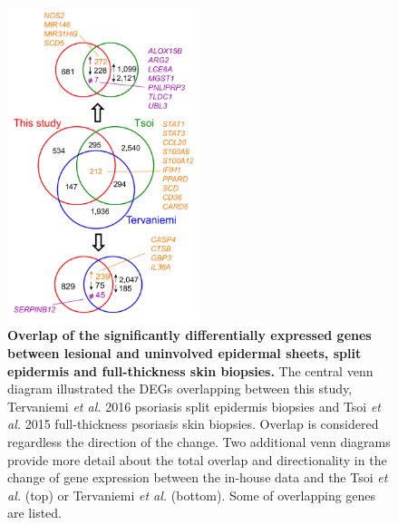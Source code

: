
\begin{figure}[ht]
\centering
\includegraphics[width=0.5\textwidth]{./Results2/pdfs/skin_transcriptomics_venn_diagrams_with_genes}
\caption[Overlap of the significantly differentially expressed genes between lesional and uninvolved epidermal sheets, split epidermis and full-thickness skin biopsies.]{\textbf{Overlap of the significantly differentially expressed genes between lesional and uninvolved epidermal sheets, split epidermis and full-thickness skin biopsies.} The central venn diagram illustrated the DEGs overlapping between this study, Tervaniemi \textit{et al.} 2016 psoriasis split epidermis biopsies and Tsoi \textit{et al.} 2015 full-thickness psoriasis skin biopsies. Overlap is considered regardless the direction of the change. Two additional venn diagrams provide more detail about the total overlap and directionality in the change of gene expression between the in-house data and the Tsoi \textit{et al.} (top) or Tervaniemi \textit{et al.} (bottom). Some of overlapping genes are listed.}
\label{figure:Skin_venn_diagrams_comparison_other_studies}
\end{figure}





